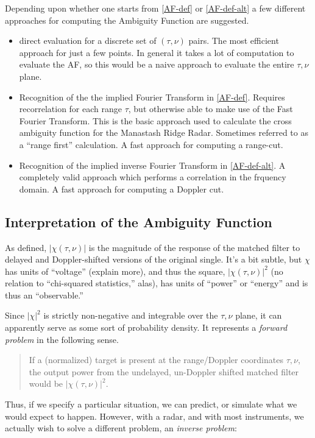 Depending upon whether one starts from \eqref{AF-def} or
\eqref{AF-def-alt} a few different approaches for computing the
Ambiguity Function are suggested.
\begin{itemize}
\item direct evaluation for a discrete set of $(\tau, \nu)$ pairs.
  The most efficient approach for just a few points. In general it
  takes a lot of computation to evaluate the AF, so this would be a
  naive approach to evaluate the entire $\tau, \nu$ plane.
\item Recognition of the the implied Fourier Transform in
  \eqref{AF-def}.  Requires recorrelation for each range $\tau$, but
  otherwise able to make use of the Fast Fourier Transform.  This is
  the basic approach used to calculate the cross ambiguity function
  for the Manastash Ridge Radar.  Sometimes referred to as a ``range
  first'' calculation.  A fast approach for computing a range-cut.
\item Recognition of the implied inverse Fourier Transform in
  \eqref{AF-def-alt}.  A completely valid approach which performs a
  correlation in the frquency domain.  A fast approach for computing a
  Doppler cut.
\end{itemize}


\subsection{Interpretation of the Ambiguity Function}

As defined, $|\chi(\tau,\nu)|$ is the magnitude of the response of the
matched filter to delayed and Doppler-shifted versions of the original
single.  It's a bit subtle, but $\chi$ has units of ``voltage''
(explain more), and thus the square, $|\chi(\tau,\nu)|^2$ (no relation
to ``chi-squared statistics,'' alas), has units of ``power'' or
``energy'' and is thus an ``observable.''

Since $|\chi|^2$ is strictly non-negative and integrable over the
$\tau, \nu$ plane, it can apparently serve as some sort of probability
density.  It represents a \textit{forward problem}  in the following sense. 

\begin{quote}
If a (normalized) target is present at the range/Doppler coordinates
$\tau, \nu$, the output power from the undelayed, un-Doppler shifted
matched filter would be $|\chi(\tau,\nu)|^2$.
\end{quote}

Thus, if we specify a particular situation, we can predict, or
simulate what we would expect to happen.  However, with a radar, and
with most instruments, we actually wish to solve a different problem,
an \textit{inverse problem}:  

